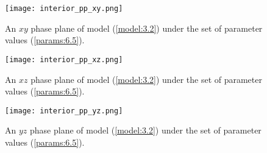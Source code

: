 \begin{figure}[H]
    \centering
    \centerline{\texttt{[image: interior\_pp\_xy.png]}}
    \caption{An $xy$ phase plane of model (\ref{model:3.2}) under the set of parameter values (\ref{params:6.5}).}
    \label{fig:phase_plane_xy}
\end{figure}

\begin{figure}[H]
    \centering
    \centerline{\texttt{[image: interior\_pp\_xz.png]}}
    \caption{An $xz$ phase plane of model (\ref{model:3.2}) under the set of parameter values (\ref{params:6.5}).}
    \label{fig:phase_plane_xz}
\end{figure}

\begin{figure}[H]
    \centering
    \centerline{\texttt{[image: interior\_pp\_yz.png]}}
    \caption{An $yz$ phase plane of model (\ref{model:3.2}) under the set of parameter values (\ref{params:6.5}).}
    \label{fig:phase_plane_yz}
\end{figure}